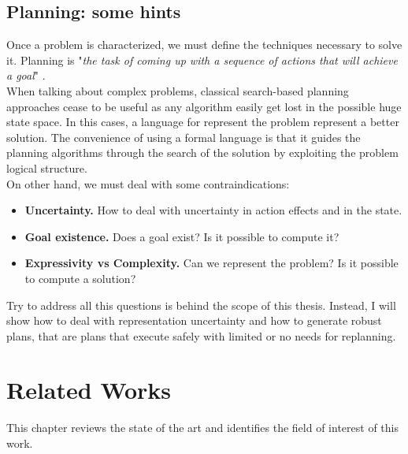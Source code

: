 \documentclass[pdftex,12pt,a4paper]{report}
\begin{document}
\section{Planning: some hints}
Once a problem is characterized, we must define the techniques necessary to solve it.
Planning is "\textit{the task of coming up with a sequence of actions that will achieve a goal}" \cite{russell2005ai}.\\
When talking about complex problems, classical search-based planning approaches cease to be useful as any algorithm easily get lost in the possible huge state space.
In this cases, a language for represent the problem represent a better solution.
The convenience of using a formal language is that it guides the planning algorithms through the search of the solution by exploiting the problem logical structure. \\
On other hand, we must deal with some contraindications:
\begin{itemize}
\item \textbf{Uncertainty.} How to deal with uncertainty in action effects and in the state.
\item \textbf{Goal existence.} Does a goal exist? Is it possible to compute it?
\item \textbf{Expressivity vs Complexity.} Can we represent the problem? Is it possible to compute a solution?
\end{itemize} 

\noindent Try to address all this questions is behind the scope of this thesis.
Instead, I will show how to deal with representation uncertainty
and how to generate robust plans, that are plans that execute safely with limited or no needs for replanning.\\

\chapter{Related Works}\label{sec:related_works}
This chapter reviews the state of the art and identifies the field of interest of this work.
\end{document}
